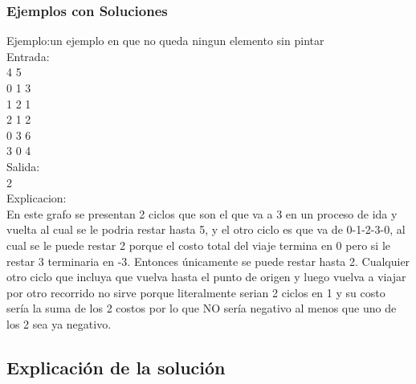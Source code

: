 \subsubsection{Ejemplos con Soluciones}
Ejemplo:un ejemplo en que no queda ningun elemento sin pintar\\
Entrada:\\
4 5\\
0 1 3\\
1 2 1\\
2 1 2\\
0 3 6\\
3 0 4\\
Salida:\\
2\\
Explicacion:\\
En este grafo se presentan 2 ciclos que son el que va a 3 en un proceso de ida y vuelta al cual se le podria restar hasta 5, y el otro ciclo es que va de 0-1-2-3-0, al cual se le puede restar 2 porque el costo total del viaje termina en 0 pero si le restar 3 terminaria en -3. Entonces únicamente se puede restar hasta 2. Cualquier otro ciclo que incluya que vuelva hasta el punto de origen y luego vuelva a viajar por otro recorrido no sirve porque literalmente serian 2 ciclos en 1 y su costo sería la suma de los 2 costos por lo que NO sería negativo al menos que uno de los 2 sea ya negativo.



\subsection{Explicación de la solución}

